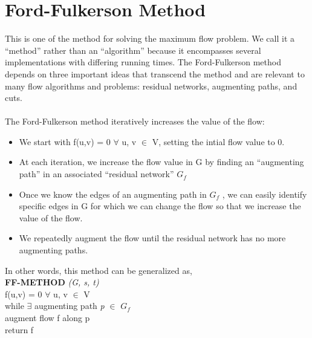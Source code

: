 \documentclass[12pt, letterpaper]{article}
\newcommand\tab[1][1cm]{\hspace*{#1}}
\begin{document}
\section{Ford-Fulkerson Method}
This is one of the method for solving the maximum flow problem. We call it a “method” rather than an “algorithm” because it encompasses several implementations with differing running times. The Ford-Fulkerson method depends on three important ideas that transcend the method and are relevant to many flow algorithms and problems: residual networks, augmenting paths, and cuts.\\\\
The Ford-Fulkerson method iteratively increases the value of the flow:
\begin{itemize}
	\item We start with f(u,v) = 0 $\forall$ u, v $\in$ V, setting the intial flow value to  0.
	\item At each iteration, we increase the flow value in G by finding an “augmenting path” in an associated “residual network” $G_f$
	\item Once we know the edges of an augmenting path in $G_f$ , we can easily identify specific edges in G for which we can change the flow so that we increase the value of the flow.
	\item We repeatedly augment the flow until the residual network has no more augmenting paths.
\end{itemize}
In other words, this method can be generalized as,\\
\textbf{FF-METHOD} \textit{(G, s, t)}\\
f(u,v) = 0 $\forall$ u, v $\in$ V\\
while $\exists$ augmenting path \textit{p} $\in$ $G_f$\\
\tab augment flow f along p\\
return f
\end{document}
